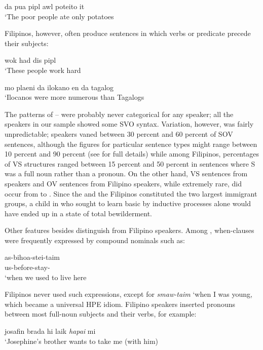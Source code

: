 \ea\label{ex:7}
da pua pipl awl poteito it \\
\glt `The poor people ate only potatoes
\z

\noindent Filipinos, however, often produce sentences in which verbs or predicate  precede their subjects:

\ea\label{ex:8}
 wok had dis pipl\\
\glt  `These people work hard
\z

\ea\label{ex:9}
mo plaeni da ilokano en da tagalog\\
\glt  `Ilocanos were more numerous than Tagalogs
\z

The patterns of -- were probably never categorical for any speaker; all the speakers in our sample showed some SVO syntax. Variation, however, was fairly unpredictable;  speakers vaned between 30 percent and 60 percent of SOV sentences, although the figures for particular sentence types might range between 10 percent and 90 percent (see \citealt{BickertonEtAl1976b} for full details) while among Filipinos, percentages of VS structures ranged between 15 percent and 50 percent in sentences where S was a full noun rather than a pronoun. On the other hand, VS sentences from  speakers and OV sentences from Filipino speakers, while extremely rare, did
occur from  to . Since the  and the Filipinos constituted the two largest immigrant groups, a child in  who sought to learn basic  by inductive processes alone would have ended up in a state of total bewilderment.

Other features besides  distinguish  from
Filipino speakers. Among , when-clauses were frequently expressed by compound nominals such as:

\ea\label{ex:10}
\gll  as-bihoa-stei-taim\\
 us-before-stay- \\
\glt  `when we used to live here
\z

\noindent Filipinos never used such expressions, except for \textit{smaw-taim} `when I was young, which became a universal HPE idiom. Filipino speakers inserted pronouns between most full-noun subjects and their verbs, for example:

\ea\label{ex:11}
josafin brada hi laik \textit{hapai} mi\\
\glt   `Josephine's brother wants to take me (with him) 
\z

